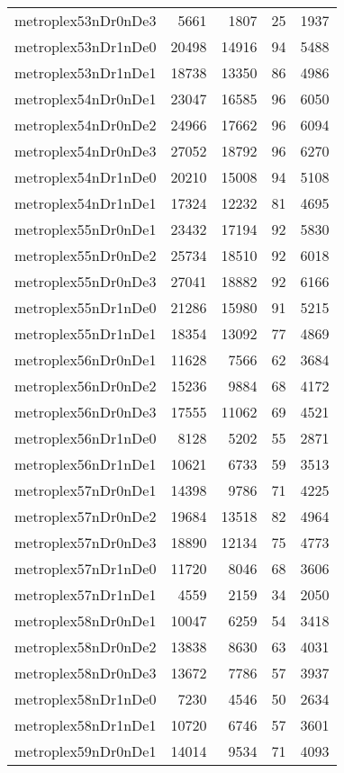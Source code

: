 \begin{longtable}{lrrrr}
metroplex53nDr0nDe3 & 5661 & 1807 & 25 & 1937 \\
metroplex53nDr1nDe0 & 20498 & 14916 & 94 & 5488 \\
metroplex53nDr1nDe1 & 18738 & 13350 & 86 & 4986 \\
metroplex54nDr0nDe1 & 23047 & 16585 & 96 & 6050 \\
metroplex54nDr0nDe2 & 24966 & 17662 & 96 & 6094 \\
metroplex54nDr0nDe3 & 27052 & 18792 & 96 & 6270 \\
metroplex54nDr1nDe0 & 20210 & 15008 & 94 & 5108 \\
metroplex54nDr1nDe1 & 17324 & 12232 & 81 & 4695 \\
metroplex55nDr0nDe1 & 23432 & 17194 & 92 & 5830 \\
metroplex55nDr0nDe2 & 25734 & 18510 & 92 & 6018 \\
metroplex55nDr0nDe3 & 27041 & 18882 & 92 & 6166 \\
metroplex55nDr1nDe0 & 21286 & 15980 & 91 & 5215 \\
metroplex55nDr1nDe1 & 18354 & 13092 & 77 & 4869 \\
metroplex56nDr0nDe1 & 11628 & 7566 & 62 & 3684 \\
metroplex56nDr0nDe2 & 15236 & 9884 & 68 & 4172 \\
metroplex56nDr0nDe3 & 17555 & 11062 & 69 & 4521 \\
metroplex56nDr1nDe0 & 8128 & 5202 & 55 & 2871 \\
metroplex56nDr1nDe1 & 10621 & 6733 & 59 & 3513 \\
metroplex57nDr0nDe1 & 14398 & 9786 & 71 & 4225 \\
metroplex57nDr0nDe2 & 19684 & 13518 & 82 & 4964 \\
metroplex57nDr0nDe3 & 18890 & 12134 & 75 & 4773 \\
metroplex57nDr1nDe0 & 11720 & 8046 & 68 & 3606 \\
metroplex57nDr1nDe1 & 4559 & 2159 & 34 & 2050 \\
metroplex58nDr0nDe1 & 10047 & 6259 & 54 & 3418 \\
metroplex58nDr0nDe2 & 13838 & 8630 & 63 & 4031 \\
metroplex58nDr0nDe3 & 13672 & 7786 & 57 & 3937 \\
metroplex58nDr1nDe0 & 7230 & 4546 & 50 & 2634 \\
metroplex58nDr1nDe1 & 10720 & 6746 & 57 & 3601 \\
metroplex59nDr0nDe1 & 14014 & 9534 & 71 & 4093 \\

\end{longtable}

